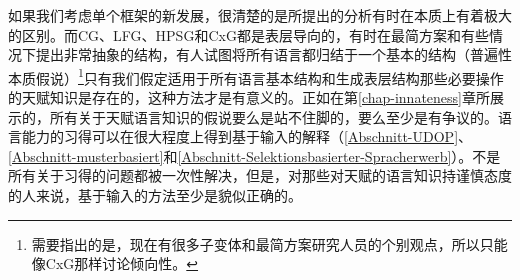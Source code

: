 如果我们考虑单个框架的新发展，很清楚的是所提出的分析有时在本质上有着极大的区别。而CG、LFG、HPSG和CxG都是表层导向的，有时在最简方案和有些情况下提出非常抽象的结构，有人试图将所有语言都归结于一个基本的结构（普遍性本质假说）\footnote{%
需要指出的是，现在有很多子变体和最简方案研究人员的个别观点，所以只能像CxG那样讨论倾向性。
}只有我们假定适用于所有语言基本结构和生成表层结构那些必要操作的天赋知识是存在的，这种方法才是有意义的。正如在第\ref{chap-innateness}章所展示的，所有关于天赋语言知识的假说要么是站不住脚的，要么至少是有争议的。语言能力的习得可以在很大程度上得到基于输入的解释（\ref{Abschnitt-UDOP}、\ref{Abschnitt-musterbasiert}和\ref{Abschnitt-Selektionsbasierter-Spracherwerb}）。不是所有关于习得的问题都被一次性解决，但是，对那些对天赋的语言知识持谨慎态度的人来说，基于输入的方法至少是貌似正确的。

